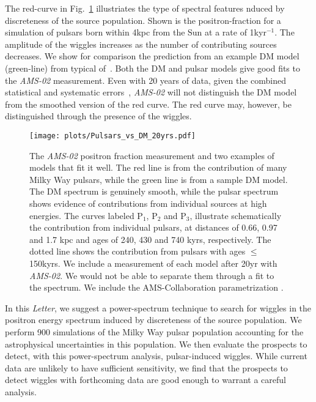 \documentclass[aps,prd,twocolumn,amsmath,superscriptaddress,amssymb,showpacs,floatfix,nofootinbib]{revtex4-1}
\begin{document}
The red-curve in Fig.~\ref{fig:PSRS_vs_DM} illustriates the type of
spectral features nduced by
discreteness of the source population.  Shown is the
positron-fraction for a simulation of pulsars
born within 4kpc  from the Sun at a rate of 1kyr$^{-1}$. 
The amplitude of the wiggles
increases as the number of contributing sources
decreases.  We show for comparison the
prediction from an example DM model (green-line)
from \cite{Cholis:2013psa} typical of~\cite{Finkbeiner:2007kk, Cholis:2008vb,
ArkaniHamed:2008qn,Cholis:2008qq}. Both the DM and
pulsar models give good fits to the \textit{AMS-02} measurement.
Even with 20 years of data, given the combined statistical and systematic
errors~\cite{Accardo:2014lma}, \textit{AMS-02} will not distinguish the DM
model from the smoothed version of the red curve.  The red curve
may, however, be distinguished through the presence of the wiggles.
\begin{figure}
\begin{centering}
\hspace{-0.6cm}
\texttt{[image: plots/Pulsars\_vs\_DM\_20yrs.pdf]}
\end{centering}
\vspace{-0.7cm}
\caption{The \textit{AMS-02} positron fraction measurement
\cite{Accardo:2014lma} and two examples of models that
fit it well. The red line is from the contribution of many Milky
Way pulsars, while the green line is from a sample DM model. 
The DM spectrum is genuinely smooth,
while the pulsar spectrum shows evidence of contributions from 
individual sources at high energies. The curves labeled 
P$_{1}$, P$_{2}$ and P$_{3}$, illustrate schematically the contribution 
from individual pulsars, at distances of 0.66, 0.97 and 1.7 kpc and ages 
of 240, 430 and 740 kyrs, respectively. 
The dotted line shows the 
contribution from pulsars with ages $\leq$150kyrs. We include 
a measurement of each model after 20yr with \textit{AMS-02}. 
We would not be able to separate them through a fit to the 
spectrum.  We include the AMS-Collaboration
parametrization \cite{Accardo:2014lma}.}
\vspace{-0.3cm}
\label{fig:PSRS_vs_DM}
\end{figure}

In this \emph{Letter}, we suggest a power-spectrum technique to
search for wiggles in the positron energy spectrum
induced by discreteness of the source population. 
We perform 900 simulations of the Milky Way pulsar
population accounting for the astrophysical uncertainties in
this population.  We then evaluate the prospects to detect, with
this power-spectrum analysis, pulsar-induced wiggles.  While
current data are unlikely to have sufficient sensitivity, we
find that the prospects to detect wiggles with forthcoming
data are good enough to warrant a careful analysis.
\end{document}
